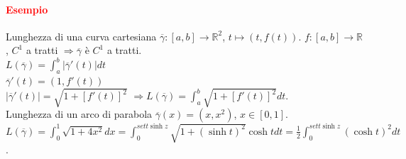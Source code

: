 \documentclass{article}
\newcommand{\R}{\mathbb{R}}
\begin{document}
\paragraph{\textcolor{red}{Esempio}}
Lunghezza di una curva cartesiana $\overline{\gamma}:[a,b]\rightarrow \R^2$, $t \mapsto (t,f(t))$. $f:[a,b]\rightarrow \R$, $C^1$ a tratti $\Rightarrow \overline{\gamma}$ è $C^1$ a tratti.\\
$L(\overline{\gamma})=\int_a^b|\overline{\gamma}'(t)|dt$\\
$\overline{\gamma}'(t)=(1,f'(t))$\\
$|\overline{\gamma}'(t)|=\sqrt{1+[f'(t)]^2}$
$\Rightarrow L(\overline{\gamma})=\int_a^b\sqrt{1+[f'(t)]^2}dt$.\\
Lunghezza di un arco di parabola $\overline{\gamma}(x)=(x,x^2)$, $x \in [0,1]$.\\
$L(\overline{\gamma})=\int_0^1\sqrt{1+4x^2}dx= \int_0^{sett \sinh z} \sqrt{1+(\sinh t)^2}\cosh t dt= \frac{1}{2}\int_0^{sett \sinh z}(\cosh t)^2dt$.
\end{document}
